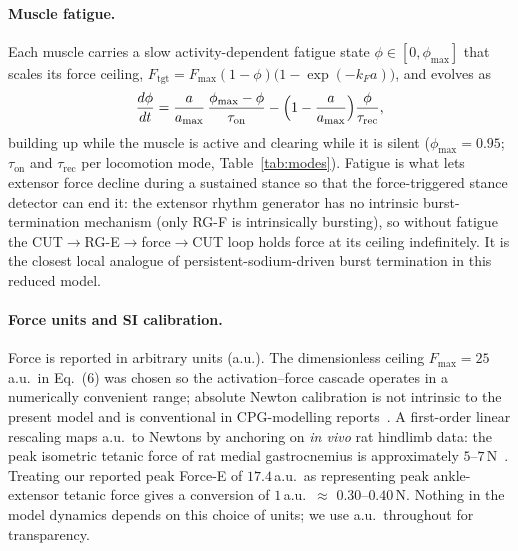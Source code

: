 \paragraph{Muscle fatigue.}
Each muscle carries a slow activity-dependent fatigue state
$\phi\in[0,\phi_{\max}]$ that scales its force ceiling,
$F_{\text{tgt}} = F_{\max}(1-\phi)\bigl(1-\exp(-k_F a)\bigr)$, and evolves as
\begin{equation}
  \frac{d\phi}{dt} = \frac{a}{a_{\max}}\,\frac{\phi_{\max}-\phi}{\tau_{\text{on}}}
    - \Bigl(1-\frac{a}{a_{\max}}\Bigr)\frac{\phi}{\tau_{\text{rec}}},
  \label{eq:fatigue}
\end{equation}
building up while the muscle is active and clearing while it is silent
($\phi_{\max}=0.95$; $\tau_{\text{on}}$ and $\tau_{\text{rec}}$ per
locomotion mode, Table~\ref{tab:modes}). Fatigue is what lets extensor force
decline during a sustained stance so that the force-triggered stance
detector can end it: the extensor rhythm generator has no intrinsic
burst-termination mechanism (only RG-F is intrinsically bursting), so
without fatigue the CUT$\to$RG-E$\to$force$\to$CUT loop holds force at its
ceiling indefinitely. It is the closest local analogue of
persistent-sodium-driven burst termination in this reduced model.

\paragraph{Force units and SI calibration.}
Force is reported in arbitrary units (a.u.). The dimensionless ceiling
$F_{\max}=25$\,a.u.\ in Eq.~(6) was chosen so the activation--force
cascade operates in a numerically convenient range; absolute Newton
calibration is not intrinsic to the present model and is conventional
in CPG-modelling reports~\cite{rybak2006,danner2017,zhang2022}. A
first-order linear rescaling maps a.u.\ to Newtons by anchoring on
\emph{in vivo} rat hindlimb data: the peak isometric tetanic force of
rat medial gastrocnemius is approximately
$5$--$7$\,N~\cite{roy1991,burkholderLieber2001}. Treating our reported
peak Force-E of $17.4$\,a.u.\ as representing peak ankle-extensor
tetanic force gives a conversion of $1$\,a.u.\ $\approx$
$0.30$--$0.40$\,N. Nothing in the model dynamics depends on this
choice of units; we use a.u.\ throughout for transparency.

